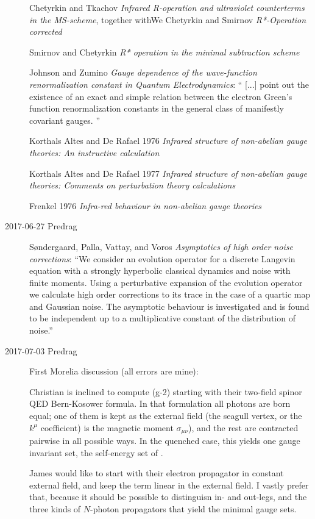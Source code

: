 \begin{description}
Chetyrkin and Tkachov {\em Infrared {R}-operation and
ultraviolet counterterms in the {MS}-scheme}, together withWe
Chetyrkin and Smirnov
{\em {R*}-Operation corrected}

Smirnov and Chetyrkin
{\em {R*} operation in the minimal subtraction scheme}

Johnson and Zumino {\em Gauge dependence of the
wave-function renormalization constant in {Quantum Electrodynamics}}: ``
[...] point out the existence of an exact and simple relation between the
electron Green's function renormalization constants in the general class
of manifestly covariant gauges.
''

Korthals Altes and De Rafael 1976
{\em Infrared structure of non-abelian gauge theories:
     {An} instructive calculation}

Korthals Altes and De Rafael 1977
{\em Infrared structure of non-abelian gauge theories:
    {Comments} on perturbation theory calculations}

Frenkel  1976
{\em Infra-red behaviour in non-abelian gauge theories}


\item[2017-06-27 Predrag]
S{\o}ndergaard, Palla,  Vattay, and Voros
{\em Asymptotics of high order noise corrections}:
``We consider an evolution operator for a discrete Langevin equation with a
strongly hyperbolic classical dynamics and noise with finite moments.
Using a perturbative expansion of the evolution operator we calculate
high order corrections to its trace in the case of a quartic map and
Gaussian noise. The asymptotic behaviour is investigated and is found to
be independent up to a multiplicative constant of the distribution of
noise.''

\item[2017-07-03 Predrag] First Morelia discussion (all errors are mine):

Christian is inclined to compute (g-2) starting with their two-field
spinor QED Bern-Kosower formula. In that formulation all photons are born equal;
one of them is kept as the external field (the seagull vertex, or the $k^\mu$
coefficient) is the
magnetic moment $\sigma_{\mu\nu}$), and the rest are contracted pairwise in
all possible ways. In the quenched case, this yields one gauge invariant set,
the self-energy set of .

James would like to start with their electron propagator in constant
external field, and keep the term linear in the external field. I vastly
prefer that, because it should be possible to distinguisn in- and
out-legs, and the three kinds of $N$-photon propagators that yield the
minimal gauge sets.


\end{description}
